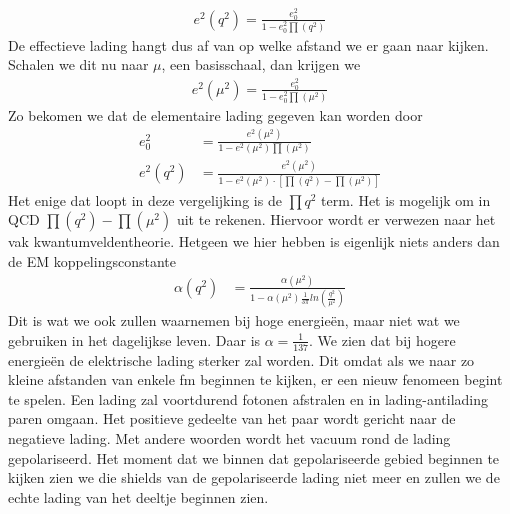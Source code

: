 \documentclass[../main.tex]{subfiles}
\begin{document}
\begin{equation}
    \begin{aligned}
        \label{eq:running_lading}
        e^2(q^2) = \frac{e_0^2}{1-e_0^2\prod(q^2)} 
    \end{aligned}
\end{equation}
De effectieve lading hangt dus af van op welke afstand we er gaan naar kijken. Schalen we dit nu naar $\mu$, een basisschaal, dan krijgen we
\begin{equation}
    \begin{aligned}
        \label{eq:running_lading_1}
        e^2(\mu^2) = \frac{e_0^2}{1-e_0^2\prod(\mu^2)} 
    \end{aligned}
\end{equation}
Zo bekomen we dat de elementaire lading gegeven kan worden door
\begin{equation}
    \begin{aligned}
        \label{eq:running_lading_2}
        e_0^2 &= \frac{e^2(\mu^2)}{1-e^2(\mu^2)\prod(\mu^2)} \\
        e^2(q^2) &= \frac{e^2(\mu^2)}{1-e^2(\mu^2)\cdot [\prod(q^2)-\prod(\mu^2)]}
    \end{aligned}
\end{equation}
Het enige dat loopt in deze vergelijking is de $\prod{q^2}$ term. Het is mogelijk om in QCD $\prod(q^2)-\prod(\mu^2)$ uit te rekenen. Hiervoor wordt er verwezen naar het vak kwantumveldentheorie. Hetgeen we hier hebben is eigenlijk niets anders dan de EM koppelingsconstante
\begin{equation}
    \begin{aligned}
        \label{eq:em_koppelingsconstante}
        \alpha(q^2) &= \frac{\alpha(\mu^2)}{1-\alpha(\mu^2) \frac{1}{3\pi} ln\left( \frac{q^2}{\mu^2} \right)}
    \end{aligned}
\end{equation}
Dit is wat we ook zullen waarnemen bij hoge energieën, maar niet wat we gebruiken in het dagelijkse leven. Daar is $\alpha = \frac{1}{137}$. We zien dat bij hogere energieën de elektrische lading sterker zal worden. Dit omdat als we naar zo kleine afstanden van enkele fm beginnen te kijken, er een nieuw fenomeen begint te spelen. Een lading zal voortdurend fotonen afstralen en in lading-antilading paren omgaan. Het positieve gedeelte van het paar wordt gericht naar de negatieve lading. Met andere woorden wordt het vacuum rond de lading gepolariseerd. Het moment dat we binnen dat gepolariseerde gebied beginnen te kijken zien we die shields van de gepolariseerde lading niet meer en zullen we de echte lading van het deeltje beginnen zien.
\end{document}

